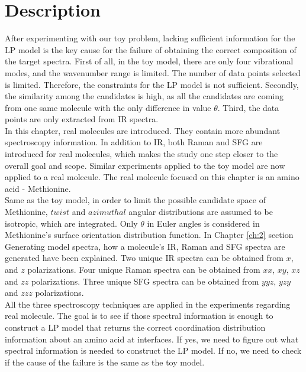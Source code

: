  \label{ch:4}
\section{Description}

After experimenting with our toy problem, lacking sufficient information for the LP model is the key cause for the failure of obtaining the correct composition of the target spectra. First of all, in the toy model, there are only four vibrational modes, and the wavenumber range is limited. The number of data points selected is limited. Therefore, the constraints for the LP model is not sufficient. Secondly, the similarity among the candidates is high, as all the candidates are coming from one same molecule with the only difference in value $\theta$. Third, the data points are only extracted from IR spectra. \\

In this chapter, real molecules are introduced. They contain more abundant spectroscopy information. In addition to IR, both Raman and SFG are introduced for real molecules, which makes the study one step closer to the overall goal and scope. Similar experiments applied to the toy model are now applied to a real molecule. The real molecule focused on this chapter is an amino acid - Methionine. \\

Same as the toy model, in order to limit the possible candidate space of Methionine, $twist$ and $azimuthal$ angular distributions are assumed to be isotropic, which are integrated. Only $\theta$ in Euler angles is considered in Methionine's surface orientation distribution function. In Chapter \ref{ch:2} section Generating model spectra, how a molecule's IR, Raman and SFG spectra are generated have been explained. Two unique IR spectra can be obtained from $x$, and $z$ polarizations. Four unique Raman spectra can be obtained from $xx$, $xy$, $xz$ and $zz$ polarizations. Three unique SFG spectra can be obtained from $yyz$, $yzy$ and $zzz$ polarizations.\\

All the three spectroscopy techniques are applied in the experiments regarding real molecule. The goal is to see if those spectral information is enough to construct a LP model that returns the correct coordination distribution information about an amino acid at interfaces. If yes, we need to figure out what spectral information is needed to construct the LP model. If no, we need to check if the cause of the failure is the same as the toy model. \\

